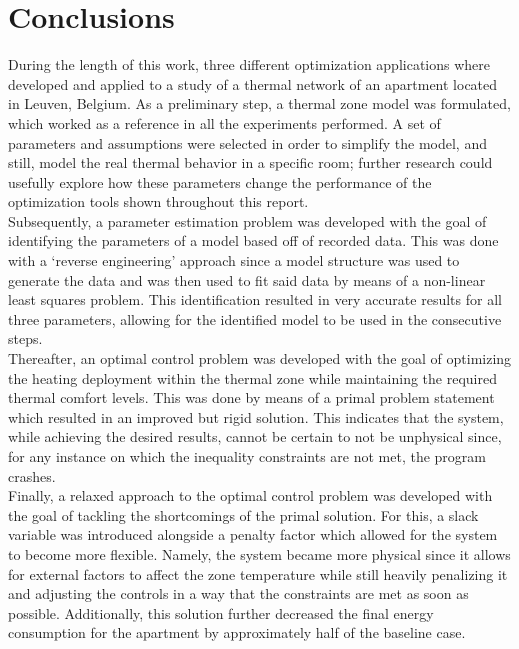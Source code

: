 \section{Conclusions}
\label{sec:conclusions}

During the length of this work, three different optimization applications where developed and applied to a study of a thermal network of an apartment located in Leuven, Belgium. As a preliminary step, a thermal zone model was formulated, which worked as a reference in all the experiments performed. A set of parameters and assumptions were selected in order to simplify the model, and still, model the real thermal behavior in a specific room; further research could usefully explore how these parameters change the performance of the optimization tools shown throughout this report.\\
 
Subsequently, a parameter estimation problem was developed with the goal of identifying the parameters of a model based off of recorded data. This was done with a `reverse engineering' approach since a model structure was used to generate the data and was then used to fit said data by means of a non-linear least squares problem. This identification resulted in very accurate results for all three parameters, allowing for the identified model to be used in the consecutive steps.\\

Thereafter, an optimal control problem was developed with the goal of optimizing the heating deployment within the thermal zone while maintaining the required thermal comfort levels. This was done by means of a primal problem statement which resulted in an improved but rigid solution. This indicates that the system, while achieving the desired results, cannot be certain to not be unphysical since, for any instance on which the inequality constraints are not met, the program crashes.\\

Finally, a relaxed approach to the optimal control problem was developed with the goal of tackling the shortcomings of the primal solution. For this, a slack variable was introduced alongside a penalty factor which allowed for the system to become more flexible. Namely, the system became more physical since it allows for external factors to affect the zone temperature while still heavily penalizing it and adjusting the controls in a way that the constraints are met as soon as possible. Additionally, this solution further decreased the final energy consumption for the apartment by approximately half of the baseline case. 